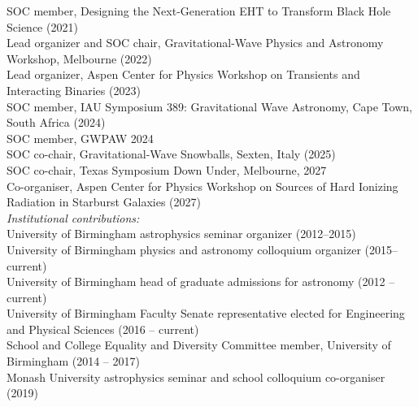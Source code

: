 \documentclass[margin,line]{res}
\begin{document}
\begin{resume}
SOC member, Designing the Next-Generation EHT to Transform Black Hole Science (2021)\\
Lead organizer and SOC chair, Gravitational-Wave Physics and Astronomy Workshop, Melbourne (2022)\\
Lead organizer, Aspen Center for Physics Workshop on Transients and Interacting Binaries (2023) \\
SOC member, IAU Symposium 389: Gravitational Wave Astronomy, Cape Town, South Africa (2024)\\
SOC member, GWPAW 2024\\
SOC co-chair, Gravitational-Wave Snowballs, Sexten, Italy (2025)\\
SOC co-chair, Texas Symposium Down Under, Melbourne, 2027\\
Co-organiser, Aspen Center for Physics Workshop on Sources of Hard Ionizing Radiation in Starburst Galaxies (2027) \\

{\it Institutional contributions:}\\
University of Birmingham astrophysics seminar organizer (2012--2015)\\
University of Birmingham physics and astronomy colloquium organizer (2015--current)\\
University of Birmingham head of graduate admissions for astronomy (2012 -- current)\\
University of Birmingham Faculty Senate representative elected for Engineering and Physical Sciences (2016 -- current)\\
School and College Equality and Diversity Committee member, University of Birmingham (2014 -- 2017) \\
Monash University astrophysics seminar and school colloquium co-organiser (2019)\\





\end{resume}
\end{document}

